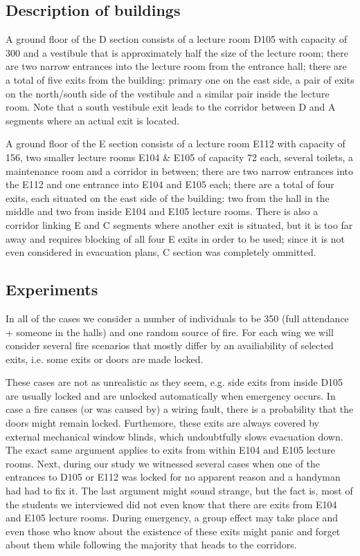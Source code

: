 \subsection{Description of buildings}
A ground floor of the D section consists of a lecture room D105 with capacity of
300 and a vestibule that is approximately half the size of the lecture room;
there are two narrow entrances into the lecture room from the entrance hall;
there are a total of five exits from the building: primary one on the east
side, a pair of exits on the north/south side of the vestibule and a similar
pair inside the lecture room.
Note that a south vestibule exit leads to the corridor between D and A segments
where an actual exit is located.

A ground floor of the E section consists of a lecture room E112 with capacity of
156, two smaller lecture rooms E104 \& E105 of capacity 72 each, several toilets,
a maintenance room and a corridor in between;
there are two narrow entrances into the E112 and one entrance into E104 and
E105 each;
there are a total of four exits, each situated on the east side of the building:
two from the hall in the middle and two from inside E104 and E105 lecture rooms.
There is also a corridor linking E and C segments where another exit is
situated, but it is too far away and requires blocking of all four E exits in
order to be used; since it is not even considered in evacuation plans, C section
was completely ommitted.

\subsection{Experiments}
In all of the cases we consider a number of individuals to be 350 (full
attendance + someone in the halls) and one random source of fire. For each wing
we will consider several fire scenarios that mostly differ by an availiability
of selected exits, i.e. some exits or doors are made locked.

These cases are not as unrealistic as they seem, e.g. side exits from inside D105 are
usually locked and are unlocked automatically when emergency occurs.
In case a fire causes (or was caused by) a wiring fault, there is a probability
that the doors might remain locked.
Furthemore, these exits are always covered by external mechanical window blinds,
which undoubtfully slows evacuation down.
The exact same argument applies to exits from within E104 and E105 lecture
rooms.
Next, during our study we witnessed several cases when one of the entrances
to D105 or E112 was locked for no apparent reason and a handyman had had to fix
it.
The last argument might sound strange, but the fact is, most of the students we
interviewed did not even know that there are exits from E104 and E105 lecture rooms.
During emergency, a group effect may take place and even those who know about
the existence of these exits might panic and forget about them while following
the majority that heads to the corridors.

